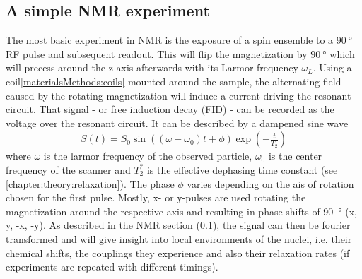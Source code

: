         \subsection{A simple NMR experiment}
        The most basic experiment in NMR is the exposure of a spin ensemble to a $\SI{90}{\degree}$ RF pulse and subsequent readout. This will flip the magnetization by $\SI{90}{\degree}$ which will precess around the z axis afterwards with its Larmor frequency $\omega_L$. Using a coil\ref{materialsMethods:coils} mounted around the sample, the alternating field caused by the rotating magnetization will induce a current driving the resonant circuit. That signal - or free induction decay (FID) - can be recorded as the voltage over the resonant circuit. It can be described by a dampened sine wave
        \begin{equation}
            S(t) = S_0 \sin((\omega - \omega_0)  t + \phi) \exp(-\tfrac{t}{T_2})
        \end{equation}
        where $\omega$ is the larmor frequency of the observed particle, $\omega_0$ is the center frequency of the scanner and $T_2^*$ is the effective dephasing time constant (see \ref{chapter:theory:relaxation}). The phase $\phi$ varies depending on the ais of rotation chosen for the first pulse. Mostly, x- or y-pulses are used rotating the magnetization around the respective axis and resulting in phase shifts of \SI{90}{\degree} (x, y, -x, -y). As described in the NMR section (\ref{}), the signal can then be fourier transformed and will give insight into local environments of the nuclei, i.e. their chemical shifts, the couplings they experience and also their relaxation rates (if experiments are repeated with different timings). 
